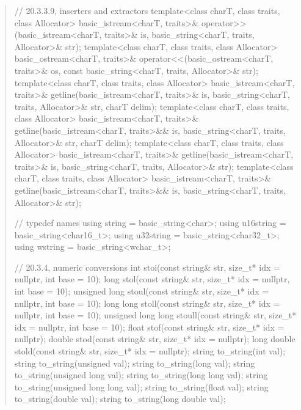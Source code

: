 \documentclass{wg21}
\begin{document}
\begin{quote}
\begin{codeblock}
{  // 20.3.3.9, inserters and extractors
  template<class charT, class traits, class Allocator>
    basic_istream<charT, traits>&
      operator>>(basic_istream<charT, traits>& is,
                 basic_string<charT, traits, Allocator>& str);
  template<class charT, class traits, class Allocator>
    basic_ostream<charT, traits>&
      operator<<(basic_ostream<charT, traits>& os,
                 const basic_string<charT, traits, Allocator>& str);
  template<class charT, class traits, class Allocator>
    basic_istream<charT, traits>&
      getline(basic_istream<charT, traits>& is,
              basic_string<charT, traits, Allocator>& str,
              charT delim);
  template<class charT, class traits, class Allocator>
    basic_istream<charT, traits>&
      getline(basic_istream<charT, traits>&& is,
              basic_string<charT, traits, Allocator>& str,
              charT delim);
  template<class charT, class traits, class Allocator>
    basic_istream<charT, traits>&
      getline(basic_istream<charT, traits>& is,
              basic_string<charT, traits, Allocator>& str);
  template<class charT, class traits, class Allocator>
    basic_istream<charT, traits>&
      getline(basic_istream<charT, traits>&& is,
              basic_string<charT, traits, Allocator>& str);

  //  typedef names
  using string    = basic_string<char>;
  using u16string = basic_string<char16_t>;
  using u32string = basic_string<char32_t>;
  using wstring   = basic_string<wchar_t>;

  // 20.3.4, numeric conversions
  int stoi(const string& str, size_t* idx = nullptr, int base = 10);
  long stol(const string& str, size_t* idx = nullptr, int base = 10);
  unsigned long stoul(const string& str, size_t* idx = nullptr, int base = 10);
  long long stoll(const string& str, size_t* idx = nullptr, int base = 10);
  unsigned long long stoull(const string& str, size_t* idx = nullptr, int base = 10);
  float stof(const string& str, size_t* idx = nullptr);
  double stod(const string& str, size_t* idx = nullptr);
  long double stold(const string& str, size_t* idx = nullptr);
  string to_string(int val);
  string to_string(unsigned val);
  string to_string(long val);
  string to_string(unsigned long val);
  string to_string(long long val);
  string to_string(unsigned long long val);
  string to_string(float val);
  string to_string(double val);
  string to_string(long double val);

}
\end{codeblock}
\end{quote}
\end{document}
